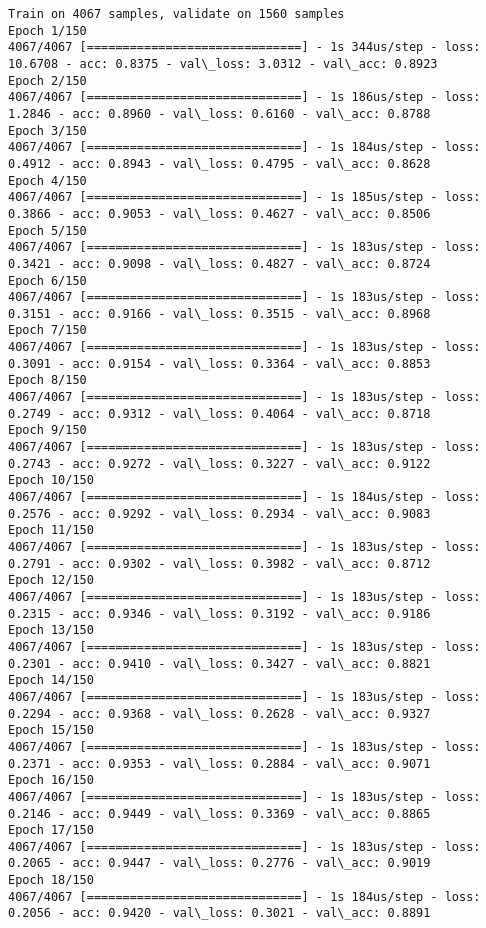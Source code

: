\documentclass[11pt]{article}
\begin{document}
    \begin{Verbatim}[commandchars=\\\{\}]
Train on 4067 samples, validate on 1560 samples
Epoch 1/150
4067/4067 [==============================] - 1s 344us/step - loss: 10.6708 - acc: 0.8375 - val\_loss: 3.0312 - val\_acc: 0.8923
Epoch 2/150
4067/4067 [==============================] - 1s 186us/step - loss: 1.2846 - acc: 0.8960 - val\_loss: 0.6160 - val\_acc: 0.8788
Epoch 3/150
4067/4067 [==============================] - 1s 184us/step - loss: 0.4912 - acc: 0.8943 - val\_loss: 0.4795 - val\_acc: 0.8628
Epoch 4/150
4067/4067 [==============================] - 1s 185us/step - loss: 0.3866 - acc: 0.9053 - val\_loss: 0.4627 - val\_acc: 0.8506
Epoch 5/150
4067/4067 [==============================] - 1s 183us/step - loss: 0.3421 - acc: 0.9098 - val\_loss: 0.4827 - val\_acc: 0.8724
Epoch 6/150
4067/4067 [==============================] - 1s 183us/step - loss: 0.3151 - acc: 0.9166 - val\_loss: 0.3515 - val\_acc: 0.8968
Epoch 7/150
4067/4067 [==============================] - 1s 183us/step - loss: 0.3091 - acc: 0.9154 - val\_loss: 0.3364 - val\_acc: 0.8853
Epoch 8/150
4067/4067 [==============================] - 1s 183us/step - loss: 0.2749 - acc: 0.9312 - val\_loss: 0.4064 - val\_acc: 0.8718
Epoch 9/150
4067/4067 [==============================] - 1s 183us/step - loss: 0.2743 - acc: 0.9272 - val\_loss: 0.3227 - val\_acc: 0.9122
Epoch 10/150
4067/4067 [==============================] - 1s 184us/step - loss: 0.2576 - acc: 0.9292 - val\_loss: 0.2934 - val\_acc: 0.9083
Epoch 11/150
4067/4067 [==============================] - 1s 183us/step - loss: 0.2791 - acc: 0.9302 - val\_loss: 0.3982 - val\_acc: 0.8712
Epoch 12/150
4067/4067 [==============================] - 1s 183us/step - loss: 0.2315 - acc: 0.9346 - val\_loss: 0.3192 - val\_acc: 0.9186
Epoch 13/150
4067/4067 [==============================] - 1s 183us/step - loss: 0.2301 - acc: 0.9410 - val\_loss: 0.3427 - val\_acc: 0.8821
Epoch 14/150
4067/4067 [==============================] - 1s 183us/step - loss: 0.2294 - acc: 0.9368 - val\_loss: 0.2628 - val\_acc: 0.9327
Epoch 15/150
4067/4067 [==============================] - 1s 183us/step - loss: 0.2371 - acc: 0.9353 - val\_loss: 0.2884 - val\_acc: 0.9071
Epoch 16/150
4067/4067 [==============================] - 1s 183us/step - loss: 0.2146 - acc: 0.9449 - val\_loss: 0.3369 - val\_acc: 0.8865
Epoch 17/150
4067/4067 [==============================] - 1s 183us/step - loss: 0.2065 - acc: 0.9447 - val\_loss: 0.2776 - val\_acc: 0.9019
Epoch 18/150
4067/4067 [==============================] - 1s 184us/step - loss: 0.2056 - acc: 0.9420 - val\_loss: 0.3021 - val\_acc: 0.8891

\end{Verbatim}
\end{document}
